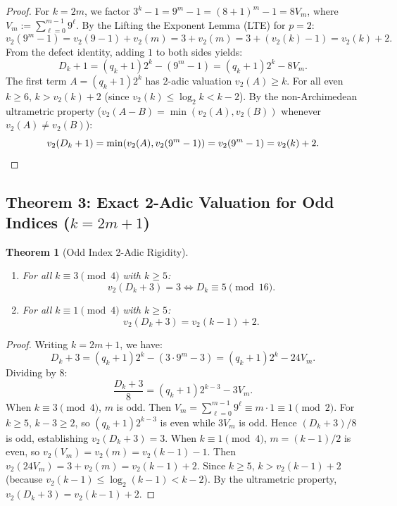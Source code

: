 \documentclass[11pt,reqno]{amsart}
\newtheorem{theorem}{Theorem}[section]
\theoremstyle{definition}
\numberwithin{equation}{section}
\begin{document}
\begin{proof}
For $k = 2m$, we factor $3^k - 1 = 9^m - 1 = (8 + 1)^m - 1 = 8 V_m$, where $V_m := \sum_{\ell=0}^{m-1} 9^\ell$.
By the Lifting the Exponent Lemma (LTE) for $p = 2$:
\[
v_2(9^m - 1) = v_2(9 - 1) + v_2(m) = 3 + v_2(m) = 3 + (v_2(k) - 1) = v_2(k) + 2.
\]
From the defect identity, adding $1$ to both sides yields:
\[
D_k + 1 = (q_k + 1)2^k - (9^m - 1) = (q_k + 1)2^k - 8 V_m.
\]
The first term $A = (q_k + 1)2^k$ has $2$-adic valuation $v_2(A) \ge k$.
For all even $k \ge 6$, $k > v_2(k) + 2$ (since $v_2(k) \le \log_2 k < k - 2$).
By the non-Archimedean ultrametric property ($v_2(A - B) = \min(v_2(A), v_2(B))$ whenever $v_2(A) \ne v_2(B)$):
\[
v_2(D_k + 1) = \min(v_2(A), v_2(9^m - 1)) = v_2(9^m - 1) = v_2(k) + 2. \qedhere
\]
\end{proof}

\subsection{\texorpdfstring{Theorem 3: Exact 2-Adic Valuation for Odd Indices ($k = 2m+1$)}{Theorem 3: Exact 2-Adic Valuation for Odd Indices (k = 2m+1)}}

\begin{theorem}[Odd Index 2-Adic Rigidity]\label{thm:odd_lte}
\hfill
\begin{enumerate}
    \item For all $k \equiv 3 \pmod 4$ with $k \ge 5$:
    \begin{equation}
    v_2(D_k + 3) = 3 \iff D_k \equiv 5 \pmod{16}.
    \end{equation}
    \item For all $k \equiv 1 \pmod 4$ with $k \ge 5$:
    \begin{equation}
    v_2(D_k + 3) = v_2(k - 1) + 2.
    \end{equation}
\end{enumerate}
\end{theorem}

\begin{proof}
Writing $k = 2m + 1$, we have:
\[
D_k + 3 = (q_k + 1)2^k - (3 \cdot 9^m - 3) = (q_k + 1)2^k - 24 V_m.
\]
Dividing by $8$:
\[
\frac{D_k + 3}{8} = (q_k + 1)2^{k-3} - 3 V_m.
\]
When $k \equiv 3 \pmod 4$, $m$ is odd. Then $V_m = \sum_{\ell=0}^{m-1} 9^\ell \equiv m \cdot 1 \equiv 1 \pmod 2$.
For $k \ge 5$, $k - 3 \ge 2$, so $(q_k + 1)2^{k-3}$ is even while $3 V_m$ is odd.
Hence $(D_k + 3)/8$ is odd, establishing $v_2(D_k + 3) = 3$.
When $k \equiv 1 \pmod 4$, $m = (k-1)/2$ is even, so $v_2(V_m) = v_2(m) = v_2(k-1) - 1$.
Then $v_2(24 V_m) = 3 + v_2(m) = v_2(k-1) + 2$. Since $k \ge 5$, $k > v_2(k-1) + 2$ (because $v_2(k-1) \le \log_2(k-1) < k - 2$). By the ultrametric property, $v_2(D_k + 3) = v_2(k-1) + 2$.
\end{proof}
\end{document}
